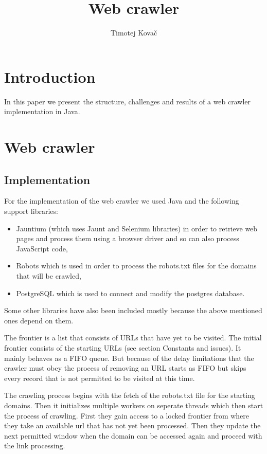 \documentclass[9pt]{IEEEtran}
\title{\vspace{0ex}
Web crawler}
\author{Timotej Kovač\vspace{-4.0ex}}
\begin{document}
\maketitle

\section{Introduction}

In this paper we present the structure, challenges and results of a web crawler implementation in Java.


\section{Web crawler}

\subsection{Implementation}

For the implementation of the web crawler we used Java and the following support libraries:
\begin{itemize}
\item{Jauntium (which uses Jaunt and Selenium libraries) in order to retrieve web pages and process them using a browser driver and so can also process JavaScript code,}
\item{Robots which is used in order to process the robots.txt files for the domains that will be crawled, }
\item{PostgreSQL which is used to connect and modify the postgres database.}
\end{itemize}

Some other libraries have also been included mostly because the above mentioned ones depend on them.

The frontier is a list that consists of URLs that have yet to be visited.
The initial frontier consists of the starting URLs (see section Constants and issues).
It mainly behaves as a FIFO queue.
But because of the delay limitations that the crawler must obey the process of removing an URL starts as FIFO but skips every record that is not permitted to be visited at this time.

The crawling process begins with the fetch of the robots.txt file for the starting domains. 
Then it initializes multiple workers on seperate threads which then start the process of crawling.
First they gain access to a locked frontier from where they take an available url that has not yet been processed.
Then they update the next permitted window when the domain can be accessed again and proceed with the link processing.
\end{document}
